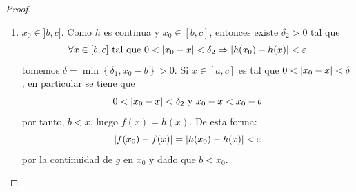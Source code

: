 \documentclass[12pt]{article}
\begin{document}
\begin{enumerate}
\begin{proof}
\begin{enumerate}
            \item $x_0\in]b,c]$. Como $h$ es continua y $x_0\in[b,c]$, entonces existe $\delta_2>0$ tal que
            \begin{equation*}
                \forall x\in[b,c]\textup{ tal que }0<\left| x_0-x \right|<\delta_2\Rightarrow \left| h(x_0)-h(x) \right|<\varepsilon
            \end{equation*}
            tomemos $\delta=\min\left\{\delta_1,x_0-b \right\}>0$. Si $x\in[a,c]$ es tal que $0<\left| x_0-x \right|<\delta$, en particular se tiene que
            \begin{equation*}
                0<\left| x_0-x \right|<\delta_2\textup{ y }x_0-x<x_0-b
            \end{equation*}
            por tanto, $b<x$, luego $f(x)=h(x)$. De esta forma:
            \begin{equation*}
                \left| f(x_0)-f(x) \right|=\left| h(x_0)-h(x) \right|<\varepsilon
            \end{equation*}
            por la continuidad de $g$ en $x_0$ y dado que $b<x_0$.


\end{enumerate}
\end{proof}
\end{enumerate}
\end{document}
